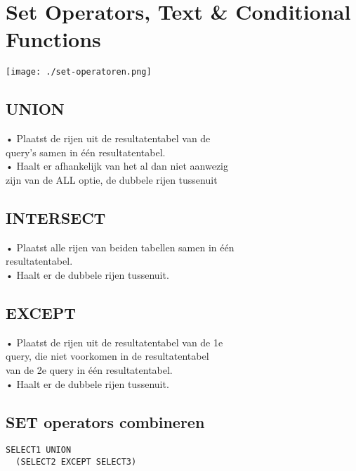 \section{Set Operators, Text \& Conditional Functions}


\texttt{[image: ./set-operatoren.png]}

\subsection{UNION}
• Plaatst de rijen uit de resultatentabel van de \\
query's samen in één resultatentabel.\\
• Haalt er afhankelijk van het al dan niet aanwezig\\
zijn van de ALL optie, de dubbele rijen tussenuit

\subsection{INTERSECT}
• Plaatst alle rijen van beiden tabellen samen in één\\
resultatentabel.\\
• Haalt er de dubbele rijen tussenuit.\\

\subsection{EXCEPT}
• Plaatst de rijen uit de resultatentabel van de 1e\\
query, die niet voorkomen in de resultatentabel\\
van de 2e query in één resultatentabel.\\
• Haalt er de dubbele rijen tussenuit.\\

\subsection{SET operators combineren}
\begin{lstlisting}
SELECT1 UNION
  (SELECT2 EXCEPT SELECT3)
\end{lstlisting}